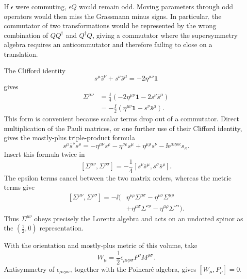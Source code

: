 \begin{enumerate}
\begin{enumerate}
      If \(\epsilon\) were commuting, \(\epsilon Q\) would remain odd.
      Moving parameters through odd operators would then miss the Grassmann
      minus signs.  In particular, the commutator of two transformations would
      be represented by the wrong combination of \(QQ^\dagger\) and
      \(Q^\dagger Q\), giving a commutator where the supersymmetry algebra
      requires an anticommutator and therefore failing to close on a
      translation.
  \end{enumerate}

The Clifford identity
  \[
    s^\mu\bar s^\nu+s^\nu\bar s^\mu
      =-2\eta^{\mu\nu}\mathbf{1}
  \]
  gives
  \[
  \begin{aligned}
    \Sigma^{\mu\nu}
      &=\frac{\ii}{4}
        \left(-2\eta^{\mu\nu}\mathbf{1}
              -2s^\nu\bar s^\mu\right)\\
      &=-\frac{\ii}{2}
        \left(\eta^{\mu\nu}\mathbf{1}
              +s^\nu\bar s^\mu\right).
  \end{aligned}
  \]
  This form is convenient because scalar terms drop out of a commutator.
  Direct multiplication of the Pauli matrices, or one further use of their
  Clifford identity, gives the mostly-plus triple-product formula
  \[
    s^\mu\bar s^\nu s^\rho
      =-\eta^{\mu\nu}s^\rho-\eta^{\nu\rho}s^\mu
       +\eta^{\mu\rho}s^\nu
       -\ii\epsilon^{\mu\nu\rho\kappa}s_\kappa .
  \]
  Insert this formula twice in
  \[
    [\Sigma^{\mu\nu},\Sigma^{\rho\sigma}]
      =-\frac14
       [s^\nu\bar s^\mu,s^\sigma\bar s^\rho].
  \]
  The epsilon terms cancel between the two matrix orders, whereas the metric
  terms give
  \[
  \begin{aligned}
    [\Sigma^{\mu\nu},\Sigma^{\rho\sigma}]
      =-\ii\big(&
        \eta^{\nu\rho}\Sigma^{\mu\sigma}
        -\eta^{\nu\sigma}\Sigma^{\mu\rho}\\
        &+\eta^{\mu\sigma}\Sigma^{\nu\rho}
        -\eta^{\mu\rho}\Sigma^{\nu\sigma}\big).
  \end{aligned}
  \]
  Thus \(\Sigma^{\mu\nu}\) obeys precisely the Lorentz
  algebra and acts on an undotted spinor as the \((\tfrac12,0)\)
  representation.

With the orientation and mostly-plus metric of this volume, take
  \[
    W_\mu=\frac12\epsilon_{\mu\nu\rho\sigma}
                 P^\nu M^{\rho\sigma}.
  \]
  Antisymmetry of \(\epsilon_{\mu\nu\rho\sigma}\), together with the
  Poincar\'e algebra, gives \([W_\mu,P_\rho]=0\).


\end{enumerate}
